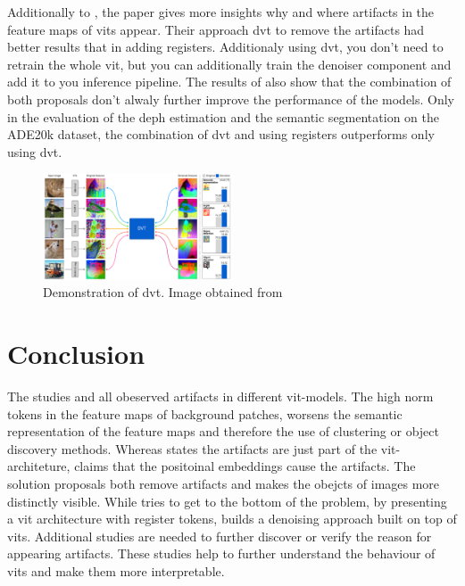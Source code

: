 \documentclass[conference]{IEEEtran}
\begin{document}
  Additionally to \cite{registers}, the paper gives more insights why and where artifacts in the feature maps of \acp{vit} appear. Their approach \ac{dvt} to remove the artifacts had better results that in \cite{registers} adding registers. Additionaly using \ac{dvt}, you don't need to retrain the whole \ac{vit}, but you can additionally train the denoiser component and add it to you inference pipeline. The results of \cite{denoising} also show that the combination of both proposals don't alwaly further improve the performance of the models. Only in the evaluation of the deph estimation and the semantic segmentation on the ADE20k dataset, the combination of \ac{dvt} and using registers outperforms only using \ac{dvt}. \cite{denoising}
 
  \begin{figure}
    \centering
    \includegraphics[width=0.5\textwidth]{figures/artifacts-positions.png}
    \caption{Demonstration of \ac{dvt}. Image obtained from \cite{denoising}}
    \label{fig:artifacts-positions}
  \end{figure}

  \section{Conclusion}
  \label{sec:conclusion}

  The studies \cite{registers} \cite{mamba-needs-registers} and \cite{denoising} all obeserved artifacts in different \ac{vit}-models. The high norm tokens in the feature maps of background patches, worsens the semantic representation of the feature maps and therefore the use of clustering or object discovery methods. Whereas \cite{registers} states the artifacts are just part of the \ac{vit}-architeture, \cite{denoising} claims that the positoinal embeddings cause the artifacts. The solution proposals both remove artifacts and makes the obejcts of images more distinctly visible. While \cite{registers} tries to get to the bottom of the problem, by presenting a \ac{vit} architecture with register tokens, \cite{denoising} builds a denoising approach built on top of \acp{vit}. 
  Additional studies are needed to further discover or verify the reason for appearing artifacts. These studies help to further understand the behaviour of \acp{vit} and make them more interpretable.
\end{document}
